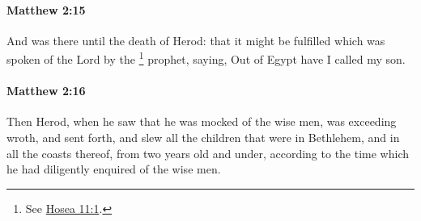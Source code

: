 		\paragraph{Matthew 2:15} %
			\label{MATTHEW-2-15}

			And was there until the death of Herod: that it might be fulfilled which was spoken of the Lord by the
				\footnote{%
					See \hyperref[HOSEA-11-1]{Hosea 11:1}.
					}%
			prophet, saying, Out of Egypt have I called my son.

			\begin{framed}
			\scriptsize
				\begin{compactdesc}
					\item[SBLG] 
				\end{compactdesc}
			\end{framed}

		\paragraph{Matthew 2:16} %
			\label{MATTHEW-2-16}

			Then Herod, when he saw that he was mocked of the wise men, was exceeding wroth, and sent forth, and slew all the children that were in Bethlehem, and in all the coasts thereof, from two years old and under, according to the time which he had diligently enquired of the wise men.

